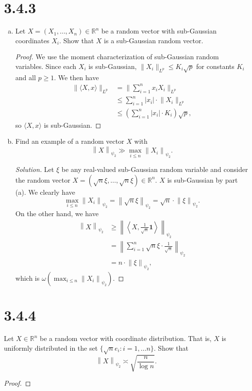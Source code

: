 \documentclass[11pt,letterpaper]{report}
\newcommand{\reals}{\mathbb{R}}
\newcommand{\subg}[1]{\left\|{#1}\right\|_{\psi_2}}
\newcommand{\Lp}[2]{\big\|{#1}\big\|_{L^{#2}}}
\newenvironment{solution}
{\begin{proof}[Solution]}
{\end{proof}}
\begin{document}
\section*{3.4.3}
\begin{enumerate}[(a)]
	\item Let $X = (X_1, \ldots, X_n)\in \reals^n$ be a random vector with sub-Gaussian coordinates $X_i$. Show that $X$ is a sub-Gaussian random vector.
	\begin{proof}
		We use the moment characterization of sub-Gaussian random variables. Since each $X_i$ is sub-Gaussian, $\Lp{X_i}{p}\leq K_i\sqrt{p}$ for constants $K_i$ and all $p\geq 1$. We then have
		\begin{align*}
			\Lp{\langle X, x\rangle}{p} &= \Lp{\sum_{i=1}^n x_iX_i}{p}\\
			&\leq \sum_{i=1}^n|x_i|\cdot \Lp{X_i}{p}\\
			&\leq \left(\sum_{i=1}^n|x_i|\cdot K_i\right)\sqrt{p},
		\end{align*}
		so $\langle X, x\rangle$ is sub-Gaussian.
	\end{proof}

	\item Find an example of a random vector $X$ with
	\[
	\subg{X} \gg \max_{i\leq n}\subg{X_i}.
	\]
	\begin{solution}
		Let $\xi$ be any real-valued sub-Gaussian random variable and consider the random vector $X = (\sqrt{n}\xi, \ldots, \sqrt{n}\xi)\in \reals^n$. $X$ is sub-Gaussian by part (a). We clearly have
		\[
		\max_{i\leq n}\subg{X_i} = \subg{\sqrt{n}\xi} = \sqrt{n}\cdot \subg{\xi}.
		\]
		On the other hand, we have
		\begin{align*}
			\subg{X} &\geq \subg{\left\langle X, \frac{1}{\sqrt{n}}\mathbf{1}\right\rangle}\\
			&= \subg{\sum_{i=1}^n\sqrt{n}\xi\cdot \frac{1}{\sqrt{n}}}\\
			&= n\cdot \subg{\xi},
		\end{align*}
		which is $\omega(\max_{i\leq n}\subg{X_i})$.
	\end{solution}
\end{enumerate}










\section*{3.4.4}
Let $X\in \reals^n$ be a random vector with coordinate distribution. That is, $X$ is uniformly distributed in the set $\{\sqrt{n}e_i: i = 1, \ldots n\}$. Show that
\[
\subg{X}\asymp \sqrt{\frac{n}{\log n}}.
\]
\begin{proof}
	
\end{proof}
\end{document}
